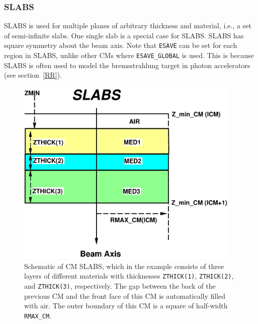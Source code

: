 \documentclass[12pt,twoside]{article}
\begin{document}
\newpage



\subsubsection{SLABS}
\renewcommand{\rightmark}{SLABS CM}

SLABS is used for multiple planes of arbitrary thickness and
material, i.e., a set
of semi-infinite slabs. One single slab is a special case for SLABS.
SLABS has square symmetry about the beam axis.  Note that \verb+ESAVE+
can be set for each region in SLABS, unlike other CMs where
\verb+ESAVE_GLOBAL+ is used.  This is because SLABS is often used to model
the bremsstrahlung target in photon accelerators (see section~\ref{RR}).
 

\begin{figure}[htbp]
\begin{center}
\leavevmode
\mbox{}\hspace{0cm}
\includegraphics[height=9cm]{figures/slabsd}
\caption[SLABS CM geometry]
{Schematic of CM SLABS, which in the example
consists of three layers of different materials with thicknesses
{\tt ZTHICK(1)}, {\tt ZTHICK(2)}, and {\tt ZTHICK(3)},
respectively. The gap between the back of the
previous CM and the front face of this CM is automatically filled with air. The
outer boundary of this CM is a square of half-width {\tt RMAX\_CM}.}
\label{fig_SLABSD}
\end{center}
\end{figure}
\end{document}

